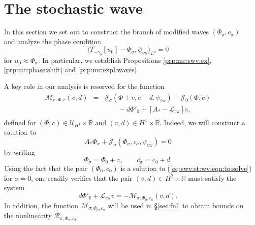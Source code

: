 \documentclass[10pt]{articleHJ}
\newcommand{\Real}{\mathbb{R}}							%
\newcommand{\sref}[1]{(\ref{#1})}                       %
\numberwithin{equation}{section}
\begin{document}
\section{The stochastic wave}
\label{sec:swv}

In this section we set out to construct the
branch of modified waves $(\Phi_{\sigma}, c_{\sigma})$
and analyze the phase condition
\begin{equation}
\label{eq:swv:phase:cond}
\langle T_{-\gamma_0} [u_0] - \Phi_{\sigma} , \psi_{\mathrm{tw}} \rangle_{L^2} = 0
\end{equation}
for $u_0 \approx \Phi_{\sigma}$.
In particular, we establish
Propositions \ref{prp:mr:swv:ex},
\ref{prp:mr:phase:shift} and \ref{prp:mr:expl:waves}.

A key role in our analysis is reserved
for the function
\begin{equation}
\label{eq:swv:def:m:sigma}
\begin{array}{lcl}
\mathcal{M}_{\sigma;\Phi, c}(v , d)
& = &
\mathcal{J}_{\sigma}
  (\Phi + v, c + d , \psi_{\mathrm{tw}})
 -  \mathcal{J}_0(\Phi, c)
\\[0.2cm]
& & \qquad
  -   d \Phi'_{0}   + [ A_*- \mathcal{L}_{\mathrm{tw}} ] v ,
\\[0.2cm]
\end{array}
\end{equation}
defined for $(\Phi, c) \in \mathcal{U}_{H^1} \times \Real$
and $(v, d) \in H^1 \times \Real$.
Indeed, we will construct a solution to
\begin{equation}
\label{eq:swv:st:wv:eqn:to:solve}
A_* \Phi_{\sigma}
  + \mathcal{J}_{\sigma}(\Phi_{\sigma}, c_{\sigma}, \psi_{\mathrm{tw}}) = 0
\end{equation}
by writing
\begin{equation}
\Phi_{\sigma} = \Phi_0 + v,
\qquad
c_{\sigma} = c_0 + d.
\end{equation}
Using the fact that the pair $(\Phi_0, c_0)$
is a solution to \sref{eq:swv:st:wv:eqn:to:solve}
for $\sigma = 0$,
one readily verifies
that the pair $(v,d) \in H^2 \times \Real$
must satisfy the system
\begin{equation}
 d \Phi'_{0}   + \mathcal{L}_{\mathrm{tw}} v
= - \mathcal{M}_{\sigma;\Phi_0, c_{0}}(v, d).
\end{equation}
In addition, the function
$\mathcal{M}_{\sigma;\Phi_{\sigma}, c_{\sigma}}$
will be used in \S\ref{sec:fnl}
to obtain bounds
on the nonlinearity
$\overline{\mathcal{R}}_{\sigma;\Phi_{\sigma}, c_{\sigma} }$.
\end{document}
